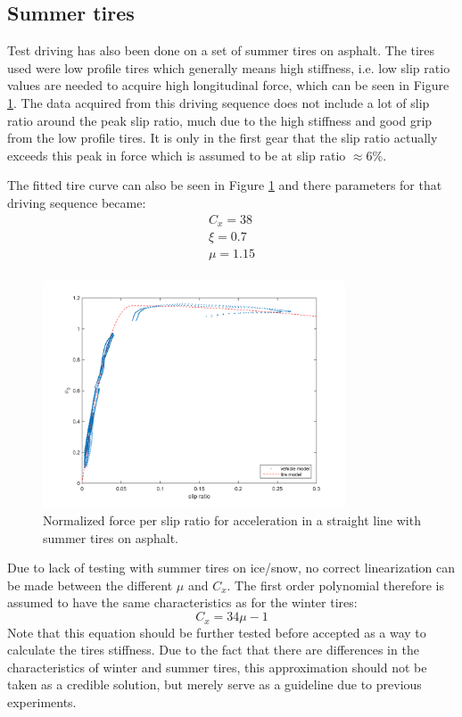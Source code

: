 \subsection{Summer tires}
\label{summer_tire}
Test driving has also been done on a set of summer tires on asphalt. The tires used were low profile tires which generally means high stiffness, i.e. low slip ratio values are needed to acquire high longitudinal force, which can be seen in Figure \ref{slip_kraft_lk_sport}. The data acquired from this driving sequence does not include a lot of slip ratio around the peak slip ratio, much due to the high stiffness and good grip from the low profile tires. It is only in the first gear that the slip ratio actually exceeds this peak in force which is assumed to be at slip ratio $ \approx 6 \% $.

The fitted tire curve can also be seen in Figure \ref{slip_kraft_lk_sport} and there parameters for that driving sequence became:
\begin{equation}
\label{summer_lk}
\begin{split}
C_{x} = 38 \\
\xi = 0.7 \\
\mu = 1.15 \\
\end{split}
\end{equation}

\begin{figure}[h]
	\centering
	\includegraphics[width=0.8\textwidth]{Pictures/slip_kraft_lk_sport}
	\caption {Normalized force per slip ratio for acceleration in a straight line with summer tires on asphalt.}
	\label{slip_kraft_lk_sport}
\end{figure}

Due to lack of testing with summer tires on ice/snow, no correct linearization can be made between the different $ \mu $ and $ C_{x} $. The first order polynomial therefore is assumed to have the same characteristics as for the winter tires:
\begin{equation}
C_{x} = 34\mu - 1
\end{equation}
Note that this equation should be further tested before accepted as a way to calculate the tires stiffness. Due to the fact that there are differences in the characteristics of winter and summer tires, this approximation should not be taken as a credible solution, but merely serve as a guideline due to previous experiments. 

